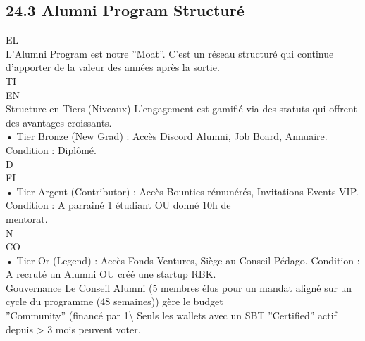 \documentclass[12pt,landscape,a4paper]{article}
\begin{document}
\subsection{24.3 Alumni Program Structuré}
\vspace{0.5em}
\vspace{0.5em}
\vspace{0.5em}
\vspace{0.5em}
EL\\
L’Alumni Program est notre ”Moat”. C’est un réseau structuré qui continue d’apporter de la valeur des années après la sortie.\\
\vspace{0.5em}
\vspace{0.5em}
\vspace{0.5em}
\vspace{0.5em}
TI\\
EN\\
Structure en Tiers (Niveaux)     L’engagement est gamifié via des statuts qui offrent des avantages croissants.\\
\vspace{0.5em}
• Tier Bronze (New Grad) : Accès Discord Alumni, Job Board, Annuaire. Condition : Diplômé.\\
\vspace{0.5em}
\vspace{0.5em}
\vspace{0.5em}
\vspace{0.5em}
D\\
FI\\
• Tier Argent (Contributor) : Accès Bounties rémunérés, Invitations Events VIP. Condition : A parrainé 1 étudiant OU donné 10h de\\
mentorat.\\
N\\
CO\\
• Tier Or (Legend) : Accès Fonds Ventures, Siège au Conseil Pédago. Condition : A recruté un Alumni OU créé une startup RBK.\\
\vspace{0.5em}
Gouvernance Le Conseil Alumni (5 membres élus pour un mandat aligné sur un cycle du programme (48 semaines)) gère le budget\\
”Community” (financé par 1\textbackslash{}%
Seuls les wallets avec un SBT ”Certified” actif depuis \textgreater{} 3 mois peuvent voter.\\
\end{document}
